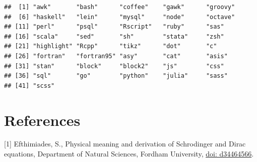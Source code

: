 \documentclass[article]{article}
\newenvironment{Shaded}{\begin{snugshade}}{\end{snugshade}}
\newcommand{\KeywordTok}[1]{\textcolor[rgb]{0.13,0.29,0.53}{\textbf{#1}}}
\newcommand{\OperatorTok}[1]{\textcolor[rgb]{0.81,0.36,0.00}{\textbf{#1}}}
\newcommand{\NormalTok}[1]{#1}
\begin{document}
\begin{Shaded}
\end{Shaded}

\begin{verbatim}
##  [1] "awk"       "bash"      "coffee"    "gawk"      "groovy"   
##  [6] "haskell"   "lein"      "mysql"     "node"      "octave"   
## [11] "perl"      "psql"      "Rscript"   "ruby"      "sas"      
## [16] "scala"     "sed"       "sh"        "stata"     "zsh"      
## [21] "highlight" "Rcpp"      "tikz"      "dot"       "c"        
## [26] "fortran"   "fortran95" "asy"       "cat"       "asis"     
## [31] "stan"      "block"     "block2"    "js"        "css"      
## [36] "sql"       "go"        "python"    "julia"     "sass"     
## [41] "scss"
\end{verbatim}

\section{References}\label{references}

{[}1{]} Efthimiades, S., Physical meaning and derivation of Schrodinger
and Dirac equations, Department of Natural Sciences, Fordham University,
\href{https://arxiv.org/vc/quant-ph/papers/0607/0607001v1.pdf}{doi:
d34464566}.
\end{document}
